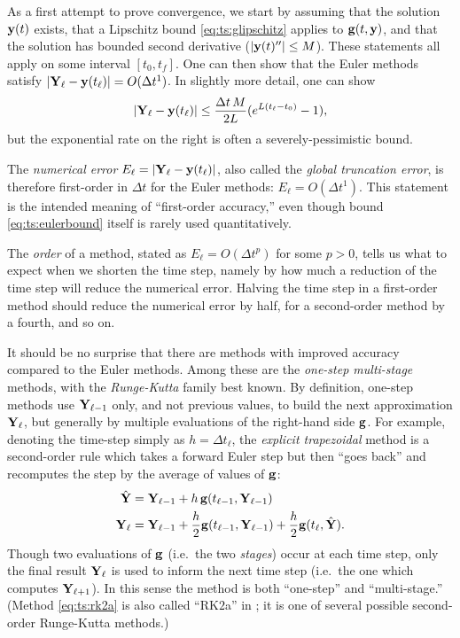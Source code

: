 As a first attempt to prove convergence, we start by assuming that the solution $\mathbf{y}(t)$ exists, that a Lipschitz bound \eqref{eq:ts:glipschitz} applies to $\mathbf{g}(t,\mathbf{y})$, and that the solution has bounded second derivative ($|\mathbf{y}(t)''|\le M$).  These statements all apply on some interval $[t_0,t_f]$.  One can then show that the Euler methods satisfy $|\mathbf{Y}_\ell-\mathbf{y}(t_\ell)| = O(\Delta t^1)$.  In slightly more detail, one can show \citep{AscherPetzold1998}
\begin{equation}
|\mathbf{Y}_\ell-\mathbf{y}(t_\ell)| \le \frac{\Delta t\,M}{2L} (e^{L(t_\ell-t_0)}-1),  \label{eq:ts:eulerbound}
\end{equation}
but the exponential rate on the right is often a severely-pessimistic bound.

The \emph{numerical error} $E_\ell = |\mathbf{Y}_\ell-\mathbf{y}(t_\ell)|$, also called the \emph{global truncation error}, is therefore first-order in $\Delta t$ for the Euler methods: $E_\ell = O(\Delta t^1)$.  This statement is the intended meaning of ``first-order accuracy,'' even though bound \eqref{eq:ts:eulerbound} itself is rarely used quantitatively.

The \emph{order} of a method, stated as $E_\ell = O(\Delta t^p)$ for some $p>0$, tells us what to expect when we shorten the time step, namely by how much a reduction of the time step will reduce the numerical error.  Halving the time step in a first-order method should reduce the numerical error by half, for a second-order method by a fourth, and so on.

\newcommand{\RKtwoa}{RK$2$a\xspace}
\newcommand{\RKthreebs}{RK$3$bs\xspace}
\newcommand{\RKfour}{RK$4$\xspace}

It should be no surprise that there are methods with improved accuracy compared to the Euler methods.  Among these are the \emph{one-step multi-stage} methods, with the \emph{Runge-Kutta} family best known.  By definition, one-step methods use $\mathbf{Y}_{\ell-1}$ only, and not previous values, to build the next approximation $\mathbf{Y}_\ell$, but generally by multiple evaluations of the right-hand side $\mathbf{g}$.  For example, denoting the time-step simply as $h=\Delta t_\ell$, the \emph{explicit trapezoidal} method \citep{AscherPetzold1998} is a second-order rule which takes a forward Euler step but then ``goes back'' and recomputes the step by the average of values of $\mathbf{g}$:
\begin{align}
\hat{\mathbf{Y}} &= \mathbf{Y}_{\ell-1} + h\, \mathbf{g}(t_{\ell-1},\mathbf{Y}_{\ell-1}) \label{eq:ts:rk2a} \\
\mathbf{Y}_\ell &= \mathbf{Y}_{\ell-1} + \frac{h}{2} \mathbf{g}(t_{\ell-1},\mathbf{Y}_{\ell-1}) + \frac{h}{2} \mathbf{g}(t_\ell,\hat{\mathbf{Y}}). \notag
\end{align}
Though two evaluations of $\mathbf{g}$ (i.e.~the two \emph{stages}) occur at each time step, only the final result $\mathbf{Y}_\ell$ is used to inform the next time step (i.e.~the one which computes $\mathbf{Y}_{\ell+1}$).  In this sense the method is both ``one-step'' and ``multi-stage.''  (Method \eqref{eq:ts:rk2a} is also called ``\RKtwoa'' in \PETSc; it is one of several possible second-order Runge-Kutta methods.)

